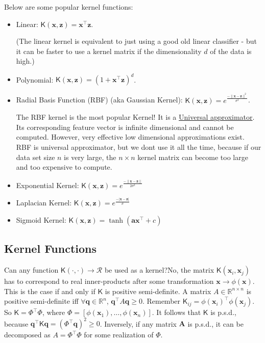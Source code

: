\documentclass[12pt]{article}
\begin{document}
 
 Below are some popular kernel functions: 
 \begin{itemize}
\item Linear: $\mathsf{K}(\mathbf{x},\mathbf{z})=\mathbf{x}^\top \mathbf{z}$.
 
 (The linear kernel is equivalent to just using a good old linear classifier - but it can be faster to use a kernel matrix if the dimensionality $d$ of the data is high.)
 
 \item Polynomial: $\mathsf{K}(\mathbf{x},\mathbf{z})=(1+\mathbf{x}^\top \mathbf{z})^d$.
 
 \item Radial Basis Function (RBF) (aka Gaussian Kernel): $\mathsf{K}(\mathbf{x},\mathbf{z})= e^\frac{-\|\mathbf{x}-\mathbf{z}\|^2}{\sigma^2}$.
 
 The RBF kernel is the most popular Kernel! It is a \href{"https://en.wikipedia.org/wiki/Universal_approximation_theorem}{Universal approximator}. Its corresponding feature vector is infinite dimensional and cannot be computed. However, very effective low dimensional approximations exist.
  RBF is universal approximator, but we dont  use it all the time, because if our data set size $n$ is very large, the $n\times n$ kernel matrix can become too large and too expensive to compute.
 
 
 \item Exponential Kernel: $\mathsf{K}(\mathbf{x},\mathbf{z})= e^\frac{-\| \mathbf{x}-\mathbf{z}\|}{2\sigma^2}$
 
\item  Laplacian Kernel: $\mathsf{K}(\mathbf{x},\mathbf{z})= e^\frac{-| \mathbf{x}-\mathbf{z}|}{\sigma}$
 
 \item Sigmoid Kernel: $\mathsf{K}(\mathbf{x},\mathbf{z})=\tanh(\mathbf{a}\mathbf{x}^\top  + c)$
 
\end{itemize}
 
  
  \subsection{Kernel Functions}
  
Can any function $\mathsf{K}(\cdot,\cdot)\rightarrow{\mathcal{R}}$ be used as a kernel?No, the matrix $\mathsf{K}(\mathbf{x}_i,\mathbf{x}_j)$ has to correspond to real inner-products after some transformation ${\mathbf{x}}\rightarrow \phi({\mathbf{x}})$. This is the case if and only if $\mathsf{K}$ is positive semi-definite. A matrix $A\in \mathbb{R}^{n\times n}$ is positive semi-definite iff $\forall \mathbf{q}\in\mathbb{R}^n$, $\mathbf{q}^\top A\mathbf{q}\geq 0$.
Remember $\mathsf{K}_{ij}=\phi(\mathbf{x}_i)^\top \phi(\mathbf{x}_j)$. So $\mathsf{K}=\Phi^\top\Phi$, where $\Phi=[\phi(\mathbf{x}_1),\dots,\phi(\mathbf{x}_n)]$.
It follows that $\mathsf{K}$ is p.s.d., because $\mathbf{q}^\top\mathsf{K}\mathbf{q}=(\Phi^\top \mathbf{q})^2\geq 0$. Inversely, if any matrix $\mathbf{A}$ is p.s.d., it can be decomposed as $A=\Phi^\top\Phi$ for some realization of $\Phi$. \\
\end{document}
